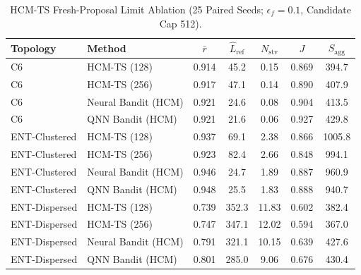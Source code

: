 \begin{table}[t]
\centering
\caption{HCM-TS Fresh-Proposal Limit Ablation (25 Paired Seeds; $\epsilon_f=0.1$, Candidate Cap 512).}
\begin{tabular}{llccccc}
\hline
Topology & Method & $\bar r$ & $\hat L_{\mathrm{ref}}$ & $N_{\mathrm{stv}}$ & $J$ & $S_{\mathrm{agg}}$ \\
\hline
C6 & HCM-TS (128) & 0.914 & 45.2 & 0.15 & 0.869 & 394.7 \\
C6 & HCM-TS (256) & 0.917 & 47.1 & 0.14 & 0.890 & 407.9 \\
C6 & Neural Bandit (HCM) & 0.921 & 24.6 & 0.08 & 0.904 & 413.5 \\
C6 & QNN Bandit (HCM) & 0.921 & 21.6 & 0.06 & 0.927 & 429.8 \\
ENT-Clustered & HCM-TS (128) & 0.937 & 69.1 & 2.38 & 0.866 & 1005.8 \\
ENT-Clustered & HCM-TS (256) & 0.923 & 82.4 & 2.66 & 0.848 & 994.1 \\
ENT-Clustered & Neural Bandit (HCM) & 0.946 & 24.7 & 1.89 & 0.887 & 960.9 \\
ENT-Clustered & QNN Bandit (HCM) & 0.948 & 25.5 & 1.83 & 0.888 & 940.7 \\
ENT-Dispersed & HCM-TS (128) & 0.739 & 352.3 & 11.83 & 0.602 & 382.4 \\
ENT-Dispersed & HCM-TS (256) & 0.747 & 347.1 & 12.02 & 0.594 & 367.0 \\
ENT-Dispersed & Neural Bandit (HCM) & 0.791 & 321.1 & 10.15 & 0.639 & 427.6 \\
ENT-Dispersed & QNN Bandit (HCM) & 0.801 & 285.0 & 9.06 & 0.676 & 430.4 \\
\hline
\end{tabular}
\end{table}
